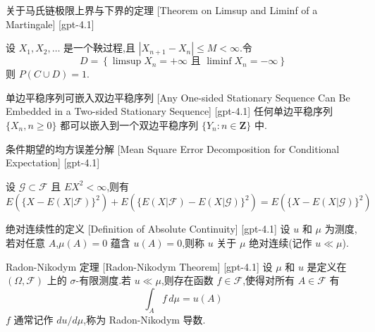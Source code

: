 \documentclass[UTF8]{ctexart}
\begin{document}
    
    
    \begin{thm}
        {关于马氏链极限上界与下界的定理}
        [Theorem on Limsup and Liminf of a Martingale]
        [gpt-4.1]
        
设 $X_{1}, X_{2}, \dots$ 是一个鞅过程,且 $|X_{n+1} - X_{n}| \leq M < \infty$.令
\[
D = \left\{ \limsup X_{n} = +\infty \text{ 且 } \liminf X_{n} = -\infty \right\}
\]
则 $P(C \cup D) = 1$.

    \end{thm}
    
    
    
    \begin{thm}
        {单边平稳序列可嵌入双边平稳序列}
        [Any One-sided Stationary Sequence Can Be Embedded in a Two-sided Stationary Sequence]
        [gpt-4.1]
        任何单边平稳序列 $\{X_n, n \geq 0\}$ 都可以嵌入到一个双边平稳序列 $\{Y_n : n \in \mathbf{Z}\}$ 中.
    \end{thm}
    
    
    
    \begin{thm}
        {条件期望的均方误差分解}
        [Mean Square Error Decomposition for Conditional Expectation]
        [gpt-4.1]
        
设 $\mathcal{G} \subset \mathcal{F}$ 且 $E X^2 < \infty$,则有
\[
E ( \{ X - E ( X | \mathcal { F } ) \} ^ { 2 } ) + E ( \{ E ( X | \mathcal { F } ) - E ( X | \mathcal { G } ) \} ^ { 2 } ) = E ( \{ X - E ( X | \mathcal { G } ) \} ^ { 2 } )
\]

    \end{thm}
    
    
    
    \begin{dfn}
        {绝对连续性的定义}
        [Definition of Absolute Continuity]
        [gpt-4.1]
        设 $
u$ 和 $\mu$ 为测度,若对任意 $A$,$\mu(A) = 0$ 蕴含 $
u(A) = 0$,则称 $
u$ 关于 $\mu$ 绝对连续(记作 $
u \ll \mu$).
    \end{dfn}
    
    
    
    \begin{thm}
        {Radon-Nikodym 定理}
        [Radon-Nikodym Theorem]
        [gpt-4.1]
        设 $\mu$ 和 $
u$ 是定义在 $(\Omega, \mathcal{F})$ 上的 $\sigma$-有限测度.若 $
u \ll \mu$,则存在函数 $f \in \mathcal{F}$,使得对所有 $A \in \mathcal{F}$ 有
\[
\int_A f\, d\mu = 
u(A)
\]
$f$ 通常记作 $d
u/d\mu$,称为 Radon-Nikodym 导数.
    \end{thm}
    
\end{document}
